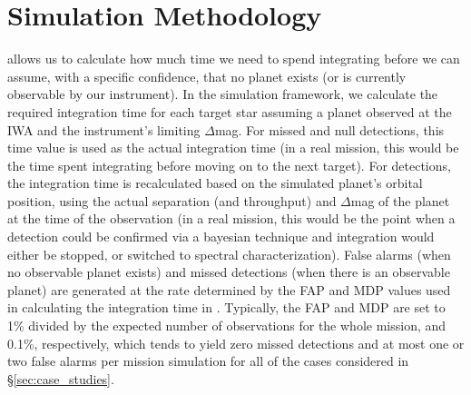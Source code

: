 \section{Simulation Methodology}
 allows us to calculate how much time we need to spend integrating before we can assume, with a specific confidence, that no planet exists (or is currently observable by our instrument).  In the simulation framework, we calculate the required integration time for each target star assuming a planet observed at the IWA and the instrument's limiting $\Delta$mag.  For missed and null detections, this time value is used as the actual integration time (in a real mission, this would be the time spent integrating before moving on to the next target).  For detections, the integration time is recalculated based on the simulated planet's orbital position, using the actual separation (and throughput) and $\Delta$mag of the planet at the time of the observation (in a real mission, this would be the point when a detection could be confirmed via a bayesian technique and integration would either be stopped, or switched to spectral characterization).  False alarms (when no observable planet exists) and missed detections (when there is an observable planet) are generated at the rate determined by the FAP and MDP values used in calculating the integration time in .  Typically, the FAP and MDP are set to 1\% divided by the expected number of observations for the whole mission, and 0.1\%, respectively, which tends to yield zero missed detections and at most one or two false alarms per mission simulation for all of the cases considered in \S\ref{sec:case_studies}.

